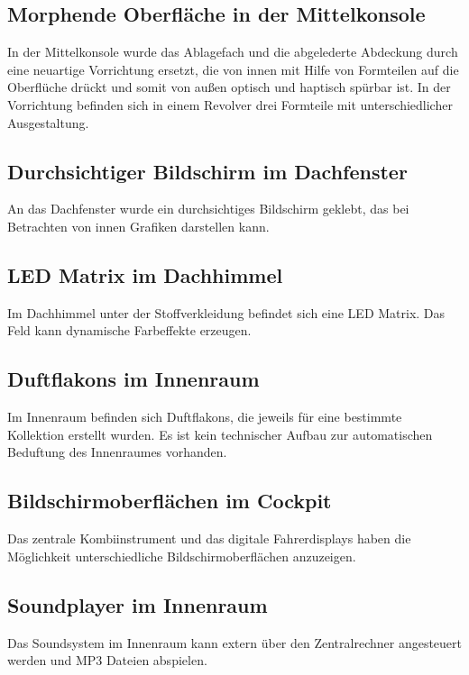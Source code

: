 \subsection{Morphende Oberfläche in der Mittelkonsole}
In der Mittelkonsole wurde das Ablagefach und die abgelederte Abdeckung durch eine neuartige Vorrichtung ersetzt, die von innen mit Hilfe von Formteilen auf die Oberflüche drückt und somit von außen optisch und haptisch spürbar ist. In der Vorrichtung befinden sich in einem Revolver drei Formteile mit unterschiedlicher Ausgestaltung.
\subsection{Durchsichtiger Bildschirm im Dachfenster}
An das Dachfenster wurde ein durchsichtiges Bildschirm geklebt, das bei Betrachten von innen Grafiken darstellen kann.
\subsection{LED Matrix im Dachhimmel}
Im Dachhimmel unter der Stoffverkleidung befindet sich eine LED Matrix. Das Feld kann dynamische Farbeffekte erzeugen.
\subsection{Duftflakons im Innenraum}
Im Innenraum befinden sich Duftflakons, die jeweils für eine bestimmte Kollektion erstellt wurden. Es ist kein technischer Aufbau zur automatischen Beduftung des Innenraumes vorhanden.
\subsection{Bildschirmoberflächen im Cockpit}
Das zentrale Kombiinstrument und das digitale Fahrerdisplays haben die Möglichkeit unterschiedliche Bildschirmoberflächen anzuzeigen.
\subsection{Soundplayer im Innenraum}
Das Soundsystem im Innenraum kann extern über den Zentralrechner angesteuert werden und MP3 Dateien abspielen.
